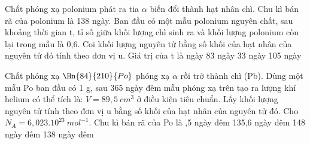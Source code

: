 \begin{vidu}%
 Chất phóng xạ polonium   phát ra tia $\alpha$ biến đổi thành hạt nhân chì. Chu kì bán rã của polonium  là 138 ngày. Ban đầu có một mẫu polonium  nguyên chất, sau khoảng thời gian t, tỉ số giữa khối lượng chì sinh ra và khối lượng polonium  còn lại trong mẫu là 0,6. Coi khối lượng nguyên tử bằng số khối của hạt nhân của nguyên tử đó tính theo đơn vị u. Giá trị của t là	
\choice
{ ngày}
{83 ngày}
{33 ngày}
{105 ngày}	
\end{vidu}
\begin{vidu}%
Chất phóng xạ $\Hn{84}{210}{Po}$ phóng xạ $\alpha$ rồi trở thành chì (Pb). Dùng một mẫu Po ban đầu có 1 g, sau 365 ngày đêm mẫu phóng xạ trên tạo ra lượng khí helium có thể tích là: $V = 89,5\ cm^3$ ở điều kiện tiêu chuẩn. Lấy khối lượng nguyên tử tính theo đơn vị u bằng số khối của hạt nhân của nguyên tử đó. Cho $N_A=6,023.10^{23}\ mol^{-1}$. Chu kì bán rã của Po là
\choice
{,5 ngày đêm}
{135,6 ngày đêm}
{148 ngày đêm}
{138 ngày đêm}
\end{vidu}

